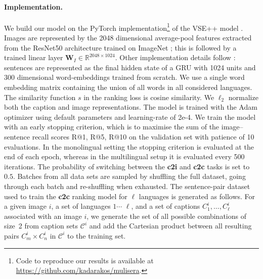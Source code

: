\paragraph{Implementation.}
We build our model on the PyTorch implementation\footnote{Code to reproduce our results is available at\\ \url{https://github.com/kadarakos/mulisera}.}
of the VSE++ model \citep{faghri2017vse++}.
Images are represented by the 2048 dimensional average-pool features
extracted from the ResNet50 architecture \citep{he2016deep} trained on ImageNet \citep{deng2009imagenet}; this is followed by a trained linear layer
$\mathbf{W}_{I} \in \mathbb{R}^{2048 \times 1024}$. Other implementation details follow \citep{faghri2017vse++}: sentences are represented as the final hidden state of a GRU \citep{chung2014empirical} with 1024 units and 300 dimensional word-embeddings trained from scratch. We use a single word embedding matrix containing  the union of all words in all considered languages.
The similarity function $s$ in the ranking loss is cosine similarity. We $\ell_2$ normalize both the caption and
image representations. The model is trained
with the Adam optimizer \citep{kingma2014adam}
using default parameters and learning-rate of \mbox{2e-4}.
We train the model with an early stopping criterion, which is to maximise the
sum of the image--sentence recall scores R@1, R@5, R@10 on the validation set with patience of 10 evaluations.
In the monolingual setting the stopping criterion is evaluated at the end of each epoch, whereas in the multilingual setup it is evaluated every 500 iterations.
The probability of switching between the {\bf c2i} and {\bf c2c} tasks is set to $0.5$. Batches from all data sets are sampled by shuffling the full dataset, going through each batch and re-shuffling when exhausted.
The sentence-pair dataset used to train the {\bf c2c} ranking model for $\ell$ languages is generated as follows.
For a given image $i$, a set of languages $1 \cdots$ $\ell$, and a set of captions $C^i_1, \ldots, C^i_\ell$ associated with an image $i$, we generate the set of all possible combinations of size~2 from caption sets $\mathcal{C}^i$ and add the Cartesian product between all resulting pairs $C^i_m \times C^i_n$ in $\mathcal{C}^i$ to the training set.

